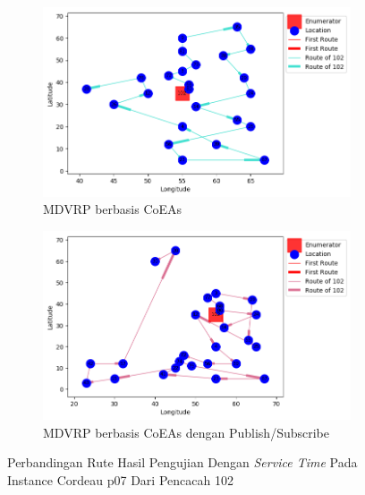 \begin{figure}[H]
	\centering
	\begin{subfigure}[t]{\textwidth}
		\centering
		\includegraphics[width=\textwidth]{Resources/Images/cordeau_p07_tw/cordeau_p07_tw_102_coes}
		\caption{MDVRP berbasis CoEAs}
		\label{fig:cordeau_p07_tw_102_coes}
	\end{subfigure}
	\begin{subfigure}[t]{\textwidth}
		\centering
		\includegraphics[width=\textwidth]{Resources/Images/cordeau_p07_tw/cordeau_p07_tw_102_pubsub_coes}
		\caption{MDVRP berbasis CoEAs dengan Publish/Subscribe}
		\label{fig:cordeau_p07_tw_102_pubsub_coes}
	\end{subfigure}
	\caption{Perbandingan Rute Hasil Pengujian Dengan \textit{Service Time} Pada Instance Cordeau p07 Dari Pencacah 102}
	\label{fig:cordeau_p07_tw_102}
\end{figure}



